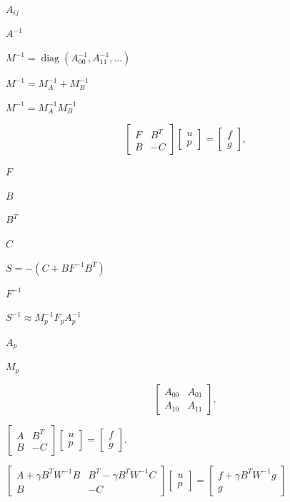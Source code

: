 \documentclass{article}
\begin{document}
$A_{ij}$
\pagebreak

$A^{-1}$
\pagebreak

$M^{-1} = \operatorname{diag}(A_{00}^{-1}, A_{11}^{-1}, \dots)$
\pagebreak

$M^{-1} = M_A^{-1} + M_B^{-1}$
\pagebreak

$M^{-1} = M_A^{-1} M_B^{-1}$
\pagebreak

\[\begin{bmatrix} F & B^T \\ B & -C \end{bmatrix}
\begin{bmatrix} u \\ p \end{bmatrix}
=
\begin{bmatrix} f \\ g \end{bmatrix},
\]
\pagebreak

$F$
\pagebreak

$B$
\pagebreak

$B^T$
\pagebreak

$C$
\pagebreak

$S = -(C + B F^{-1} B^T)$
\pagebreak

$F^{-1}$
\pagebreak

$S^{-1} \approx M_p^{-1} F_p A_p^{-1}$
\pagebreak

$A_p$
\pagebreak

$M_p$
\pagebreak

\[\begin{bmatrix} A_{00} & A_{01} \\ A_{10} & A_{11} \end{bmatrix},
\]
\pagebreak

$\left[ \begin{array}{cc}
A & B^T \\
B & -C
\end{array} \right]
\left[ \begin{array}{c}
u \\
p
\end{array} \right]
=
\left[ \begin{array}{c}
f \\
g
\end{array} \right].
$
\pagebreak

$\left[ \begin{array}{cc}
A + \gamma B^T W^{-1} B & B^T - \gamma B^T W^{-1} C \\
B & -C
\end{array} \right]
\left[ \begin{array}{c}
u \\
p
\end{array} \right]
=
\left[ \begin{array}{c}
f + \gamma B^T W^{-1} g \\
g
\end{array} \right]
$
\pagebreak
\end{document}
